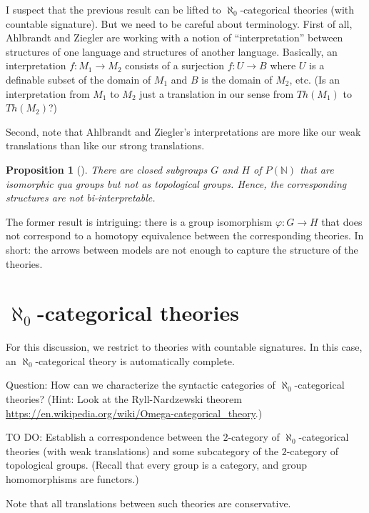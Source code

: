 \documentclass[12pt]{article}
\newtheorem*{prop}{Proposition}
\theoremstyle{definition}
\begin{document}
I suspect that the previous result can be lifted to
$\aleph _0$-categorical theories (with countable signature). But we
need to be careful about terminology. First of all, Ahlbrandt and
Ziegler are working with a notion of ``interpretation'' between
structures of one language and structures of another language.
Basically, an interpretation $f:M_1\to M_2$ consists of a surjection
$f:U\to B$ where $U$ is a definable subset of the domain of $M_1$ and
$B$ is the domain of $M_2$, etc. (Is an interpretation from $M_1$ to
$M_2$ just a translation in our sense from $Th(M_1)$ to $Th(M_2)$?)

Second, note that Ahlbrandt and Ziegler's interpretations are more
like our weak translations than like our strong translations. 

\begin{prop}[\cite{evans1990}] There are closed subgroups $G$ and $H$
  of $P(\mathbb{N})$ that are isomorphic qua groups but not as
  topological groups. Hence, the corresponding structures are not
  bi-interpretable. \end{prop}

The former result is intriguing: there is a group isomorphism
$\varphi :G\to H$ that does not correspond to a homotopy equivalence
between the corresponding theories. In short: the arrows between
models are not enough to capture the structure of the theories.

\section{$\aleph _0$-categorical theories}

For this discussion, we restrict to theories with countable
signatures. In this case, an $\aleph _0$-categorical theory is
automatically complete.

Question: How can we characterize the syntactic categories of
$\aleph _0$-categorical theories? (Hint: Look at the Ryll-Nardzewski
theorem \url{https://en.wikipedia.org/wiki/Omega-categorical_theory}.)

TO DO: Establish a correspondence between the $2$-category of
$\aleph _0$-categorical theories (with weak translations) and some
subcategory of the $2$-category of topological groups. (Recall that
every group is a category, and group homomorphisms are functors.)

Note that all translations between such theories are conservative. 

\newcommand{\3}{\mathcal}
\end{document}
